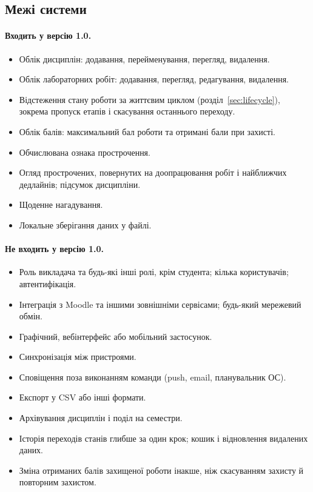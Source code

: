 \documentclass[12pt,a4paper]{article}
\begin{document}
\subsection{Межі системи}

\paragraph{Входить у версію 1.0.}
\begin{itemize}[nosep]
  \item Облік дисциплін: додавання, перейменування, перегляд, видалення.
  \item Облік лабораторних робіт: додавання, перегляд, редагування, видалення.
  \item Відстеження стану роботи за життєвим циклом (розділ~\ref{sec:lifecycle}), зокрема пропуск етапів і скасування останнього переходу.
  \item Облік балів: максимальний бал роботи та отримані бали при захисті.
  \item Обчислювана ознака прострочення.
  \item Огляд прострочених, повернутих на доопрацювання робіт і найближчих дедлайнів; підсумок дисципліни.
  \item Щоденне нагадування.
  \item Локальне зберігання даних у файлі.
\end{itemize}

\paragraph{Не входить у версію 1.0.}
\begin{itemize}[nosep]
  \item Роль викладача та будь-які інші ролі, крім студента; кілька користувачів; автентифікація.
  \item Інтеграція з Moodle та іншими зовнішніми сервісами; будь-який мережевий обмін.
  \item Графічний, вебінтерфейс або мобільний застосунок.
  \item Синхронізація між пристроями.
  \item Сповіщення поза виконанням команди (push, email, планувальник ОС).
  \item Експорт у CSV або інші формати.
  \item Архівування дисциплін і поділ на семестри.
  \item Історія переходів станів глибше за один крок; кошик і відновлення видалених даних.
  \item Зміна отриманих балів захищеної роботи інакше, ніж скасуванням захисту й повторним захистом.
\end{itemize}
\end{document}
